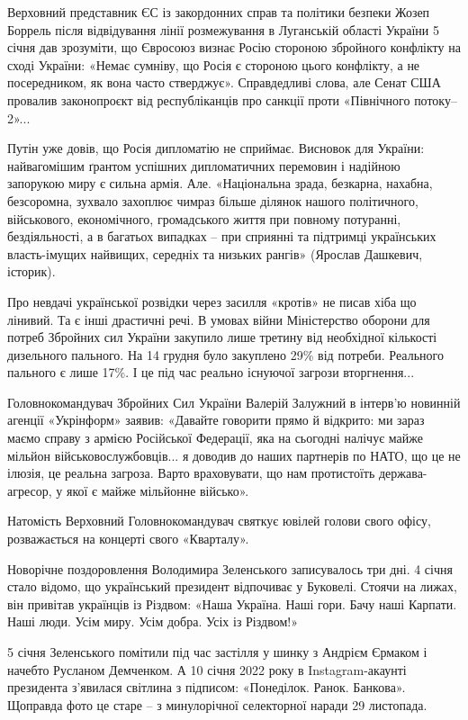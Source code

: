 Верховний представник ЄС із закордонних справ та політики безпеки Жозеп Боррель
після відвідування лінії розмежування в Луганській області України 5 січня дав
зрозуміти, що Євросоюз визнає Росію стороною збройного конфлікту на сході
України: «Немає сумніву, що Росія є стороною цього конфлікту, а не
посередником, як вона часто стверджує». Справдедливі слова, але Сенат США
провалив законопроєкт від республіканців про санкції проти «Північного
потоку–2»...

Путін уже довів, що Росія дипломатію не сприймає. Висновок для України:
найвагомішим ґрантом успішних дипломатичних перемовин і надійною запорукою миру
є сильна армія. Але. «Національна зрада, безкарна, нахабна, безсоромна, зухвало
захоплює чимраз більше ділянок нашого політичного, військового, економічного,
громадського життя при повному потуранні, бездіяльності, а в багатьох випадках
– при сприянні та підтримці українських власть-імущих найвищих, середніх та
низьких рангів» (Ярослав Дашкевич, історик).

Про невдачі української розвідки через засилля «кротів» не писав хіба що
лінивий. Та є інші драстичні речі. В умовах війни Міністерство оборони для
потреб Збройних сил України закупило лише третину від необхідної кількості
дизельного пального. На 14 грудня було закуплено 29\% від потреби. Реального
пального є лише 17\%. І це під час реально існуючої загрози вторгнення...

Головнокомандувач Збройних Сил України Валерій Залужний в інтерв’ю
новинній агенції «Укрінформ» заявив: «Давайте говорити прямо й відкрито: ми
зараз маємо справу з армією Російської Федерації, яка на сьогодні налічує майже
мільйон військовослужбовців... я доводив до наших партнерів по НАТО, що це не
ілюзія, це реальна загроза. Варто враховувати, що нам протистоїть
держава-агресор, у якої є майже мільйонне військо».

Натомість Верховний Головнокомандувач святкує ювілей голови свого офісу,
розважається на концерті свого «Кварталу».

Новорічне поздоровлення Володимира Зеленського записувалось три дні. 4 січня
стало відомо, що український президент відпочиває у Буковелі. Стоячи на лижах,
він привітав українців із Різдвом: «Наша Україна. Наші гори. Бачу наші Карпати.
Наші люди. Усім миру. Усім добра. Усіх із Різдвом!»

5 січня Зеленського помітили під час застілля у шинку з Андрієм Єрмаком і
начебто Русланом Демченком. А 10 січня 2022 року в Instagram-акаунті президента
з’явилася світлина з підписом: «Понеділок. Ранок. Банкова». Щоправда фото це
старе – з минулорічної селекторної наради 29 листопада.

